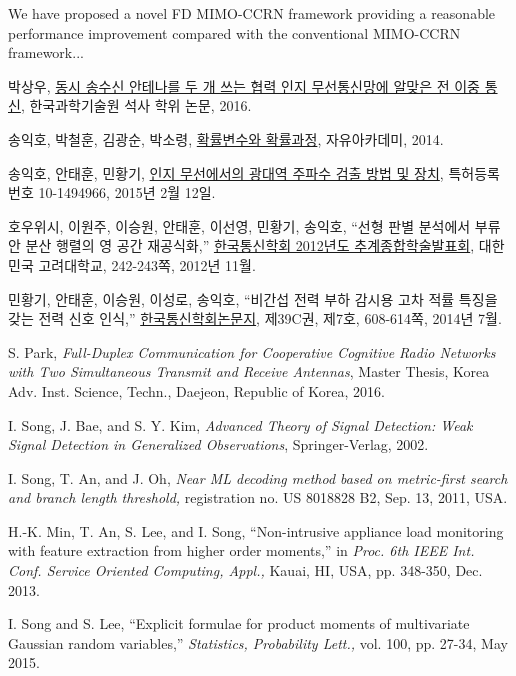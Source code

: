 \documentclass[master,english,final]{kaist-ucs}
\begin{document}
We have proposed a novel FD MIMO-CCRN framework providing a reasonable performance improvement compared with the conventional MIMO-CCRN framework...
\begin{thebibliography}{00}

 박상우, \underline{동시 송수신 안테나를 두 개 쓰는 협력 인지 무선통신망에 알맞은 전 이중 통신}, 한국과학기술원 석사 학위 논문, 2016.

 송익호, 박철훈, 김광순, 박소령, \underline{확률변수와 확률과정}, 자유아카데미, 2014.

 송익호, 안태훈, 민황기, \underline{인지 무선에서의 광대역 주파수 검출 방법 및 장치}, 특허등록번호 10-1494966, 2015년 2월 12일.

 호우위시, 이원주, 이승원, 안태훈, 이선영, 민황기, 송익호, “선형 판별 분석에서 부류안 분산 행렬의 영 공간 재공식화,” \underline{한국통신학회 2012년도 추계종합학술발표회}, 대한민국 고려대학교, 242-243쪽, 2012년 11월.

 민황기, 안태훈, 이승원, 이성로, 송익호, “비간섭 전력 부하 감시용 고차 적률 특징을 갖는 전력 신호 인식,” \underline{한국통신학회논문지}, 제39C권, 제7호, 608-614쪽, 2014년 7월.



 S. Park, \textit{Full-Duplex Communication for Cooperative Cognitive Radio Networks with Two Simultaneous Transmit and Receive Antennas}, Master Thesis, Korea Adv. Inst. Science, Techn., Daejeon, Republic of Korea, 2016.

  I. Song, J. Bae, and S. Y. Kim, \textit{Advanced Theory of Signal Detection: Weak Signal Detection in Generalized Observations}, Springer-Verlag, 2002.

 I. Song, T. An, and J. Oh, \textit{Near ML decoding method based on metric-first search and branch length threshold,} registration no. US 8018828 B2, Sep. 13, 2011, USA.

 H.-K. Min, T. An, S. Lee, and I. Song, “Non-intrusive appliance load monitoring with feature extraction from higher order moments,” in \textit{Proc. 6th IEEE Int. Conf. Service Oriented Computing, Appl.,} Kauai, HI, USA, pp. 348-350, Dec. 2013.

 I. Song and S. Lee, “Explicit formulae for product moments of multivariate Gaussian random variables,” \textit{Statistics, Probability Lett.,} vol. 100, pp. 27-34, May 2015.


\end{thebibliography}
\end{document}
